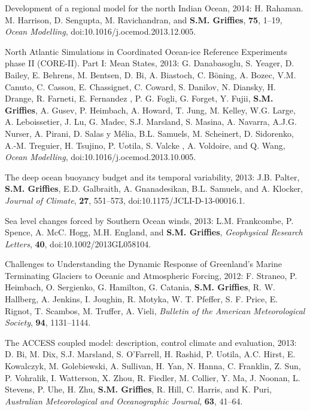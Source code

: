 \begin{etaremune}
\item Development of a regional model for the north Indian Ocean,
  2014: H. Rahaman. M. Harrison, D. Sengupta, M.  Ravichandran, and
  {\bf S.M. Grif\/f\/ies}, {\bf 75}, 1--19, {\it Ocean Modelling},
  doi:10.1016/j.ocemod.2013.12.005.

\item North Atlantic Simulations in Coordinated Ocean-ice Reference
  Experiments phase II (CORE-II). Part I: Mean States, 2013: G.
  Danabasoglu, S. Yeager, D. Bailey, E. Behrens, M. Bentsen, D. Bi,
  A. Biastoch, C. {B\"{o}ning}, A. Bozec, V.M. Canuto, C. Cassou,
  E. Chassignet, C. Coward, S. Danilov, N. Diansky, H. Drange,
  R. Farneti, E. Fernandez , P. G. Fogli, G. Forget, Y. Fujii, {\bf
    S.M. Grif\/f\/ies}, A.  Gusev, P. Heimbach, A.  Howard, T. Jung,
  M. Kelley, W.G. Large, A. Leboissetier, J. Lu, G. Madec,
  S.J. Marsland, S. Masina, A. Navarra, A.J.G. Nurser, A. Pirani,
  D. Salas y {M\'{e}lia}, B.L. Samuels, M. Scheinert, D. Sidorenko,
  A.-M. Treguier, H. Tsujino, P.   Uotila, S. Valcke , A. Voldoire, and
  Q. Wang, {\it Ocean Modelling}, doi:10.1016/j.ocemod.2013.10.005.

\item The deep ocean buoyancy budget and its temporal variability,
  2013: J.B. Palter, {\bf S.M. Grif\/f\/ies}, E.D. Galbraith,
  A. Gnanadesikan, B.L. Samuels, and A. Klocker, {\it Journal of
    Climate}, {\bf 27}, 551--573,
  doi:10.1175/JCLI-D-13-00016.1.

\item Sea level changes forced by Southern Ocean winds, 2013:
  L.M. Frankcombe, P. Spence, A. McC. Hogg, M.H. England, and {\bf
    S.M. Grif\/f\/ies}, {\it Geophysical Research Letters}, {\bf 40},
  doi:10.1002/2013GL058104.

\item Challenges to Understanding the Dynamic Response of Greenland's
  Marine Terminating Glaciers to Oceanic and Atmospheric Forcing,
  2012: F. Straneo, P. Heimbach, O. Sergienko, G. Hamilton,
  G. Catania, {\bf S.M. Grif\/f\/ies}, R. W. Hallberg, A. Jenkins,
  I. Joughin, R. Motyka, W. T. Pfeffer, S. F. Price, E. Rignot,
  T. Scambos, M. Truffer, A. Vieli, {\it Bulletin of the American
    Meteorological Society}, {\bf 94}, 1131--1144.

\item The ACCESS coupled model: description, control climate and
  evaluation, 2013: D. Bi, M. Dix, S.J. Marsland, S. O'Farrell,
  H. Rashid, P. Uotila, A.C. Hirst, E. Kowalczyk, M. Golebiewski,
  A. Sullivan, H. Yan, N. Hanna, C. Franklin, Z. Sun, P. Vohralik,
  I. Watterson, X. Zhou, R. Fiedler, M. Collier, Y. Ma, J. Noonan,
  L. Stevens, P. Uhe, H. Zhu, {\bf S.M. Grif\/f\/ies}, R. Hill,
  C. Harris, and K. Puri, {\it Australian Meteorological and
    Oceanographic Journal}, {\bf 63}, 41--64.


\end{etaremune}
